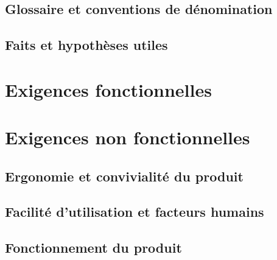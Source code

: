 \documentclass[a4paper, 12pt, french]{report}
\begin{document}
		\section{Glossaire et conventions de dénomination}
			

		\section{Faits et hypothèses utiles}
			

	\chapter{Exigences fonctionnelles}
	\chapter{Exigences non fonctionnelles}
		\section{Ergonomie et convivialité du produit}
			

		\section{Facilité d'utilisation et facteurs humains}
			

		\section{Fonctionnement du produit}
			
		
\end{document}
